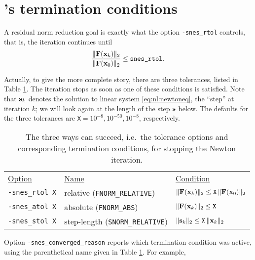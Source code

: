 \section{\PETSc's termination conditions}

A residual norm reduction goal is exactly what the option \texttt{-snes\_rtol} controls, that is, the iteration continues until
    $$\frac{\|\mathbf{F}(\mathbf{x}_k)\|_2}{\|\mathbf{F}(\mathbf{x}_0)\|_2} \le \text{\texttt{snes\_rtol}}.$$

Actually, to give the more complete story, there are three \pSNES tolerances, listed in Table \ref{tab:snestolerances}.  The iteration stops as soon as one of these conditions is satisfied.  Note that $\mathbf{s}_k$ denotes the solution to linear system \eqref{eq:nl:newtoneq}, the ``step'' at iteration $k$; we will look again at the length of the step $\mathbf{s}$ below.  The defaults for the three tolerances are \texttt{X}$=10^{-8},10^{-50},10^{-8}$, respectively.

\begin{table}
\begin{tabular}{lll}
\underline{Option}\hspace{0.2in} & \underline{Name}\hspace{0.2in} & \underline{Condition}\hspace{0.2in} \\
\texttt{-snes\_rtol X} & relative (\texttt{FNORM\_RELATIVE}) & $\|\mathbf{F}(\mathbf{x}_k)\|_2 \le \text{\texttt{X}}\, \|\mathbf{F}(\mathbf{x}_0)\|_2$ \\
\texttt{-snes\_atol X} & absolute (\texttt{FNORM\_ABS}) & $\|\mathbf{F}(\mathbf{x}_k)\|_2 \le \text{\texttt{X}}$ \\
\texttt{-snes\_stol X} & step-length (\texttt{SNORM\_RELATIVE}) & $\|\mathbf{s}_k\|_2 \le \text{\texttt{X}}\, \|\mathbf{x}_k\|_2$
\end{tabular}
\caption{The three ways \pSNES can succeed, i.e.~the tolerance options and corresponding termination conditions, for stopping the Newton iteration.} \label{tab:snestolerances}
\end{table}

\medskip
Option \texttt{-snes\_converged\_reason} reports which termination condition was active, using the parenthetical name given in Table \ref{tab:snestolerances}.  For example,


